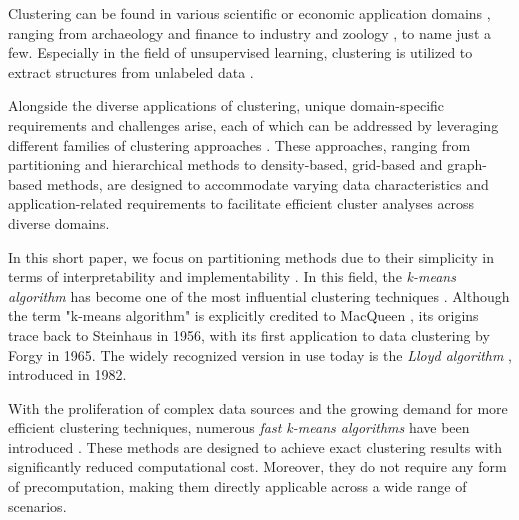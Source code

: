 \documentclass[english]{lni}
\begin{document}
Clustering can be found in various scientific or economic application domains \cite{ezugwu2022comprehensive,oyewole2023data, gan2020data}, ranging from archaeology \cite{troiano2024comparative} and finance \cite{cai2016clustering} to industry \cite{lee2021technological} and zoology \cite{shen2021multivariate}, to name just a few. Especially in the field of unsupervised learning, clustering is utilized to extract structures from unlabeled data \cite{chander2023data}.

Alongside the diverse applications of clustering, unique domain-specific requirements and challenges arise, each of which can be addressed by leveraging different families of clustering approaches \cite{xu2015comprehensive,han2012data}. These approaches, ranging from partitioning and hierarchical methods to density-based, grid-based and graph-based methods, are designed to accommodate varying data characteristics and application-related requirements to facilitate efficient cluster analyses across diverse domains.


In this short paper, we focus on partitioning methods due to their simplicity in terms of interpretability and implementability \cite{DBLP:conf/iiwas/BeecksBHLSD22}. In this field, the \emph{k-means algorithm} \cite{bock2007clustering,hans2008origins,DBLP:journals/prl/Jain10,steinley2006k} has become one of the most influential clustering techniques \cite{DBLP:journals/kais/WuKQGYMMNLYZSHS08,olukanmi2019rethinking}. Although the term "k-means algorithm" is explicitly credited to MacQueen \cite{macqueen1967}, its origins trace back to Steinhaus \cite{steinhaus1956division} in 1956, with its first application to data clustering by Forgy \cite{forgy1965cluster} in 1965. The widely recognized version in use today is the \emph{Lloyd algorithm} \cite{DBLP:journals/tit/Lloyd82}, introduced in 1982.

With the proliferation of complex data sources and the growing demand for more efficient clustering techniques, numerous \emph{fast k-means algorithms} have been introduced \cite{DBLP:conf/icml/Elkan03,DBLP:conf/sdm/Hamerly10,drake2012accelerated,hamerly2015accelerating,DBLP:conf/icml/NewlingF16,DBLP:conf/icml/DingZSMM15}. These methods are designed to achieve exact clustering results with significantly reduced computational cost. Moreover, they do not require any form of precomputation, making them directly applicable across a wide range of scenarios.
\end{document}

